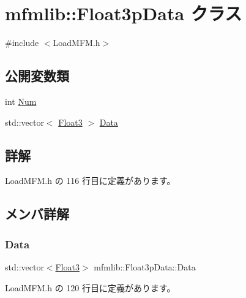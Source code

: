 \hypertarget{classmfmlib_1_1_float3p_data}{}\section{mfmlib\+:\+:Float3p\+Data クラス}
\label{classmfmlib_1_1_float3p_data}


{\ttfamily \#include $<$Load\+M\+F\+M.\+h$>$}

\subsection*{公開変数類}
\begin{DoxyCompactItemize}
\item 
int \mbox{\hyperlink{classmfmlib_1_1_float3p_data_ae0785dd7af23fffbaa3c4d0b772e9e1f}{Num}}
\item 
std\+::vector$<$ \mbox{\hyperlink{structmfmlib_1_1_float3}{Float3}} $>$ \mbox{\hyperlink{classmfmlib_1_1_float3p_data_abb697c919314c799a539ea3934212ef2}{Data}}
\end{DoxyCompactItemize}


\subsection{詳解}


 Load\+M\+F\+M.\+h の 116 行目に定義があります。



\subsection{メンバ詳解}
\mbox{\label{classmfmlib_1_1_float3p_data_abb697c919314c799a539ea3934212ef2}} 
\subsubsection{\texorpdfstring{Data}{Data}}
{\footnotesize\ttfamily std\+::vector$<$\mbox{\hyperlink{structmfmlib_1_1_float3}{Float3}}$>$ mfmlib\+::\+Float3p\+Data\+::\+Data}



 Load\+M\+F\+M.\+h の 120 行目に定義があります。

\mbox{\label{classmfmlib_1_1_float3p_data_ae0785dd7af23fffbaa3c4d0b772e9e1f}} 
